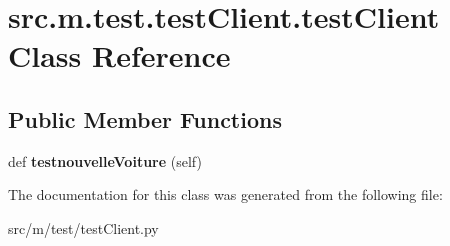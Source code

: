 \hypertarget{classsrc_1_1m_1_1test_1_1test_client_1_1test_client}{}\section{src.\+m.\+test.\+test\+Client.\+test\+Client Class Reference}
\label{classsrc_1_1m_1_1test_1_1test_client_1_1test_client}
\subsection*{Public Member Functions}
\begin{DoxyCompactItemize}
\item 
\hypertarget{classsrc_1_1m_1_1test_1_1test_client_1_1test_client_a8e9583cf218039561787a6b84550747f}{}def {\bfseries testnouvelle\+Voiture} (self)\label{classsrc_1_1m_1_1test_1_1test_client_1_1test_client_a8e9583cf218039561787a6b84550747f}

\end{DoxyCompactItemize}


The documentation for this class was generated from the following file\+:\begin{DoxyCompactItemize}
\item 
src/m/test/test\+Client.\+py\end{DoxyCompactItemize}
